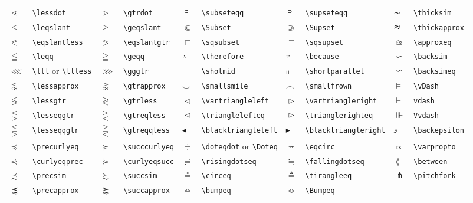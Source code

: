 \documentclass[10pt, english]{article}
\begin{document}
	\begin{center}
		\scriptsize
	\begin{tabular}{ll|ll|ll|ll|ll}
		$\lessdot$ & \verb|\lessdot| & $\gtrdot$ & \verb|\gtrdot| & $\subseteqq$ & \verb|\subseteqq| & $\supseteqq$ & \verb|\supseteqq| & $\thicksim$ & \verb|\thicksim| \\
		$\leqslant$ & \verb|\leqslant| & $\geqslant$ & \verb|\geqslant| & $\Subset$ & \verb|\Subset| & $\Supset$ & \verb|\Supset| & $\thickapprox$ & \verb|\thickapprox| \\
		$\eqslantless$ & \verb|\eqslantless| & $\eqslantgtr$ & \verb|\eqslantgtr| & $\sqsubset$ & \verb|\sqsubset| & $\sqsupset$ & \verb|\sqsupset| & $\approxeq$ & \verb|\approxeq| \\
		$\leqq$ & \verb|\leqq| & $\geqq$ & \verb|\geqq| & $\therefore$ & \verb|\therefore| & $\because$ & \verb|\because| & $\backsim$ & \verb|\backsim| \\
		$\lll$ & \verb|\lll| or \verb|\llless| & $\ggg$ & \verb|\gggtr| & $\shortmid$ & \verb|\shotmid| & $\shortparallel$ & \verb|\shortparallel| & $\backsimeq$ & \verb|\backsimeq| \\
		$\lessapprox$ & \verb|\lessapprox| & $\gtrapprox$ & \verb|\gtrapprox| & $\smallsmile$ & \verb|\smallsmile| & $\smallfrown$ & \verb|\smallfrown| & $\vDash$ & \verb|\vDash| \\
		$\lessgtr$ & \verb|\lessgtr| & $\gtrless$ & \verb|\gtrless| & $\vartriangleleft$ & \verb|\vartriangleleft| & $\vartriangleright$ & \verb|\vartriangleright| & $\vdash$ & \verb|vdash| \\
		$\lesseqgtr$ & \verb|\lesseqgtr| & $\gtreqless$ & \verb|\gtreqless| & $\trianglelefteq$ & \verb|\trianglelefteq| & $\trianglerighteq$ & \verb|\trianglerighteq| & $\Vvdash$ & \verb|Vvdash| \\
		$\lesseqqgtr$ & \verb|\lesseqqgtr| & $\gtreqqless$ & \verb|\gtreqqless| & $\blacktriangleleft$ & \verb|\blacktriangleleft| & $\blacktriangleright$ & \verb|\blacktriangleright| & $\backepsilon$ & \verb|\backepsilon| \\
		$\preccurlyeq$ & \verb|\precurlyeq| & $\succcurlyeq$ & \verb|\succcurlyeq| & $\doteqdot$ & \verb|\doteqdot| or \verb|\Doteq| & $\eqcirc$ & \verb|\eqcirc| & $\varpropto$ & \verb|\varpropto| \\
		$\curlyeqprec$ & \verb|\curlyeqprec| & $\curlyeqsucc$ & \verb|\curlyeqsucc| & $\risingdotseq$ & \verb|\risingdotseq| & $\fallingdotseq$ & \verb|\fallingdotseq| & $\between$ & \verb|\between| \\
		$\precsim$ & \verb|\precsim| & $\succsim$ & \verb|\succsim| & $\circeq$ & \verb|\circeq| & $\triangleq$ & \verb|\tirangleeq| & $\pitchfork$ & \verb|\pitchfork| \\
		$\precapprox$ & \verb|\precapprox| & $\succapprox$ & \verb|\succapprox| & $\bumpeq$ & \verb|\bumpeq| & $\Bumpeq$ & \verb|\Bumpeq| \\
	\end{tabular}
	\end{center}
\end{document}
